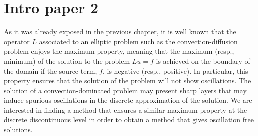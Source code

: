
\section{Intro paper 2}

As it was already exposed in the previous chapter, it is well known that the operator $L$ associated to an elliptic problem such as the convection-diffusion problem enjoys the maximum property, meaning that the maximum (resp., minimum) of the solution to the problem $Lu=f$ is achieved on the boundary of the domain if the source term, $f$, is negative (resp., positive). 
In particular, this property ensures that the solution of the problem will not show oscillations. The solution of a convection-dominated problem may present sharp layers that may induce spurious oscillations in the discrete approximation of the solution. We are interested in finding a method that ensures a similar maximum property at the discrete discontinuous level in order to obtain a method that gives oscillation free solutions.

